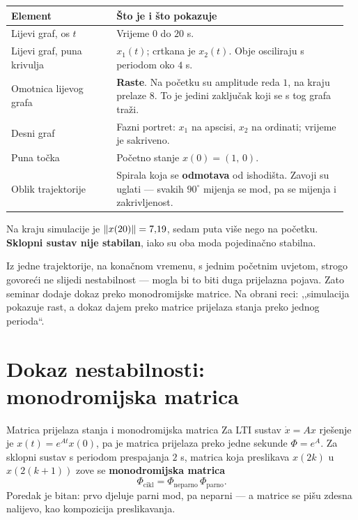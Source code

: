\begin{longtable}{@{}p{0.30\linewidth} p{0.66\linewidth}@{}}
\toprule
\textbf{Element} & \textbf{Što je i što pokazuje} \\
\midrule
\endhead
Lijevi graf, os $t$ & Vrijeme $0$ do $20$ s. \\[5pt]
Lijevi graf, puna krivulja & $x_1(t)$; crtkana je $x_2(t)$. Obje osciliraju s
periodom oko $4$ s. \\[5pt]
Omotnica lijevog grafa & \textbf{Raste}. Na početku su amplitude reda $1$, na
kraju prelaze $8$. To je jedini zaključak koji se s tog grafa traži. \\[5pt]
Desni graf & Fazni portret: $x_1$ na apscisi, $x_2$ na ordinati; vrijeme je
sakriveno. \\[5pt]
Puna točka & Početno stanje $x(0) = (1,\,0)$. \\[5pt]
Oblik trajektorije & Spirala koja se \textbf{odmotava} od ishodišta. Zavoji su
uglati --- svakih $90^\circ$ mijenja se mod, pa se mijenja i zakrivljenost. \\
\bottomrule
\end{longtable}

Na kraju simulacije je $\left\lVert x(20) \right\rVert = 7{,}19$, sedam puta više nego na početku.
\textbf{Sklopni sustav nije stabilan}, iako su oba moda pojedinačno stabilna.

\begin{zamka}
Iz jedne trajektorije, na konačnom vremenu, s jednim početnim uvjetom, strogo
govoreći ne slijedi nestabilnost --- mogla bi to biti duga prijelazna pojava.
Zato seminar dodaje dokaz preko monodromijske matrice. Na obrani reci:
,,simulacija pokazuje rast, a dokaz dajem preko matrice prijelaza stanja preko
jednog perioda``.
\end{zamka}

\section{Dokaz nestabilnosti: monodromijska matrica}
\label{sec:z4-monodromija}

\begin{pojam}{Matrica prijelaza stanja i monodromijska matrica}
Za LTI sustav $\dot{x} = Ax$ rješenje je $x(t) = e^{At}x(0)$, pa je matrica
prijelaza preko jedne sekunde $\Phi = e^{A}$. Za sklopni sustav s periodom
prespajanja $2$ s, matrica koja preslikava $x(2k)$ u $x(2(k+1))$ zove se
\textbf{monodromijska matrica}
\begin{equation}
\Phi_{\mathrm{cikl}} = \Phi_{\mathrm{neparno}}\, \Phi_{\mathrm{parno}} .
\end{equation}
Poredak je bitan: prvo djeluje parni mod, pa neparni --- a matrice se pišu
zdesna nalijevo, kao kompozicija preslikavanja.
\end{pojam}


